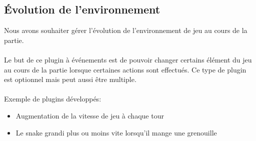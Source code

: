 \documentclass[12pt,a4paper]{article}
\begin{document}
\subsection{Évolution de l'environnement} 
Nous avons souhaiter gérer l'évolution de l'environnement de jeu au cours de 
la partie.
\\\\
Le but de ce plugin à événements est de pouvoir changer certains élément du jeu 
au cours de la partie lorsque certaines actions sont effectués. Ce type de plugin 
est optionnel mais peut aussi être multiple. 
\\\\
Exemple de plugins développés: 
\begin{itemize}
   \item Augmentation de la vitesse de jeu à chaque tour
   \item Le snake grandi plus ou moins vite lorsqu'il mange une grenouille    
\end{itemize}
\end{document}
